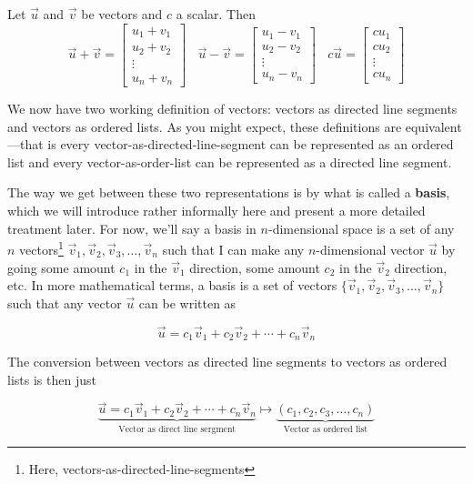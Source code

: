 \begin{definition}
	Let $\vec{u}$ and $\vec{v}$ be vectors and $c$ a scalar. Then
	$$
	\vec{u} + \vec{v} = \begin{bmatrix} u_1 + v_1 \\ u_2 + v_2 \\ \vdots \\ u_n+v_n \end{bmatrix}\:\:\:\:
	\vec{u} - \vec{v} = \begin{bmatrix} u_1 - v_1 \\ u_2 - v_2 \\ \vdots \\ u_n-v_n \end{bmatrix}\:\:\:\:
	c\vec{u} = \begin{bmatrix} cu_1 \\ cu_2 \\ \vdots \\ cu_n \end{bmatrix}
	$$
\end{definition}

We now have two working definition of vectors: vectors as directed line segments and vectors as ordered lists. As you might expect, these definitions are equivalent---that is every vector-as-directed-line-segment can be represented as an ordered list and every vector-as-order-list can be represented as a directed line segment.

The way we get between these two representations is by what is called a \textbf{basis}, which we will introduce rather informally here and present a more detailed treatment later. For now, we'll say a basis in $n$-dimensional space is a set of any $n$ vectors\footnote{Here, vectors-as-directed-line-segments} $\vec{v}_1, \vec{v}_2, \vec{v}_3, \ldots , \vec{v}_n$ such that I can make any $n$-dimensional vector $\vec{u}$ by going some amount $c_1$ in the $\vec{v}_1$ direction, some amount $c_2$ in the $\vec{v}_2$ direction, etc. In more mathematical terms, a basis is a set of vectors $\{\vec{v}_1, \vec{v}_2, \vec{v}_3, \ldots , \vec{v}_n\}$ such that any vector $\vec{u}$ can be written as

$$
\vec{u} = c_1 \vec{v}_1 + c_2 \vec{v}_2 + \cdots + c_n \vec{v}_n
$$

The conversion between vectors as directed line segments to vectors as ordered lists is then just

$$
\underbrace{\vec{u} = c_1 \vec{v}_1 + c_2 \vec{v}_2 + \cdots + c_n \vec{v}_n}_{\text{Vector as direct line sergment}} \mapsto \underbrace{(c_1, c_2, c_3, \ldots, c_n)}_{\text{Vector as ordered list}}
$$

